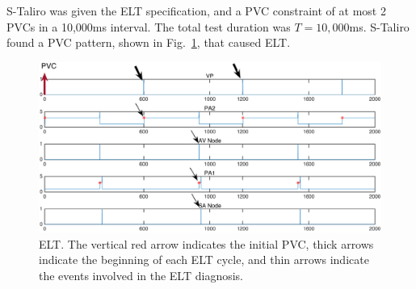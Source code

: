 S-Taliro was given the ELT specification, and a PVC constraint of at most 2 PVCs in a 10,000ms interval. 
The total test duration was $T= 10,000$ms.
S-Taliro found a PVC pattern, shown in Fig.~\ref{fig:bug13_kept1}, that caused ELT.
\begin{figure}[t]
\centering
\includegraphics[height=0.2\textheight,width=1\columnwidth]{figures/markedELT.pdf}
\caption{ELT. The vertical red arrow indicates the initial PVC, thick arrows indicate the beginning of each ELT cycle, and thin arrows indicate the events involved in the ELT diagnosis.}
\label{fig:bug13_kept1}
\end{figure}


